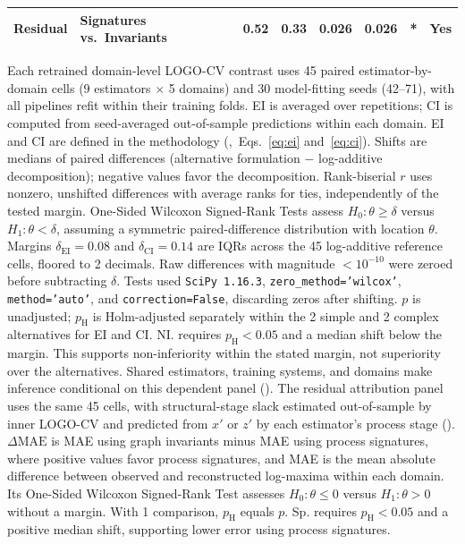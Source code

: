 \documentclass{article}
\begin{document}
\begin{table}[H]
\begin{tabularx}{\linewidth}{@{}l>{\raggedright\arraybackslash}Xrrrrrr@{}}
\midrule
Residual & Signatures vs.\ Invariants & 0.52 & 0.33 & 0.026 & 0.026 & * & Yes \\
\bottomrule
\end{tabularx}
\par\vspace{12pt}
\begin{minipage}{\linewidth}
\footnotesize
Each retrained domain-level LOGO-CV contrast uses 45 paired estimator-by-domain cells (9 estimators $\times$ 5 domains) and 30 model-fitting seeds (42--71), with all pipelines refit within their training folds. EI is averaged over repetitions; CI is computed from seed-averaged out-of-sample predictions within each domain. EI and CI are defined in the methodology (,~Eqs.~\eqref{eq:ei} and~\eqref{eq:ci}). Shifts are medians of paired differences (alternative formulation $-$ log-additive decomposition); negative values favor the decomposition. Rank-biserial $r$ uses nonzero, unshifted differences with average ranks for ties, independently of the tested margin. One-Sided Wilcoxon Signed-Rank Tests assess $H_0:\theta\geq\delta$ versus $H_1:\theta<\delta$, assuming a symmetric paired-difference distribution with location $\theta$. Margins $\delta_{\mathrm{EI}} = 0.08$ and $\delta_{\mathrm{CI}} = 0.14$ are IQRs across the 45 log-additive reference cells, floored to 2 decimals. Raw differences with magnitude $<10^{-10}$ were zeroed before subtracting $\delta$. Tests used \texttt{SciPy 1.16.3}, \texttt{zero\_method='wilcox'}, \texttt{method='auto'}, and \texttt{correction=False}, discarding zeros after shifting. $p$ is unadjusted; $p_{\mathrm H}$ is Holm-adjusted separately within the 2 simple and 2 complex alternatives for EI and CI. NI. requires $p_{\mathrm H}<0.05$ and a median shift below the margin. This supports non-inferiority within the stated margin, not superiority over the alternatives. Shared estimators, training systems, and domains make inference conditional on this dependent panel (). The residual attribution panel uses the same 45 cells, with structural-stage slack estimated out-of-sample by inner LOGO-CV and predicted from $x'$ or $z'$ by each estimator's process stage (). $\Delta\mathrm{MAE}$ is MAE using graph invariants minus MAE using process signatures, where positive values favor process signatures, and MAE is the mean absolute difference between observed and reconstructed log-maxima within each domain. Its One-Sided Wilcoxon Signed-Rank Test assesses $H_0:\theta\leq0$ versus $H_1:\theta>0$ without a margin. With 1 comparison, $p_{\mathrm H}$ equals $p$. Sp. requires $p_{\mathrm H}<0.05$ and a positive median shift, supporting lower error using process signatures.
\end{minipage}
\end{table}
\end{document}
